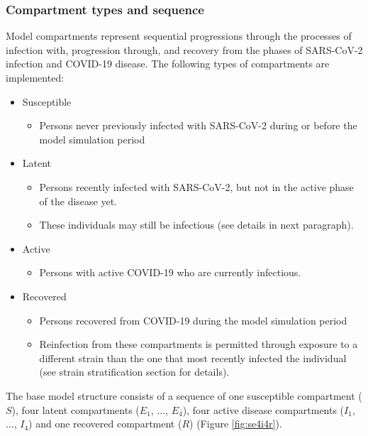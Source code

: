 \subsubsection{Compartment types and sequence}
Model compartments represent sequential progressions through the processes of 
infection with, progression through, and recovery from the phases of SARS-CoV-2
infection and COVID-19 disease. The following types of compartments are implemented:
\begin{itemize}
    \item Susceptible
    \begin{itemize}
        \item Persons never previously infected with SARS-CoV-2 during or before the model simulation period
    \end{itemize}
    \item Latent
    \begin{itemize}
        \item Persons recently infected with SARS-CoV-2, but not in the active phase of the disease yet.
        \item These individuals may still be infectious (see details in next paragraph).
    \end{itemize}
    \item Active
    \begin{itemize}
        \item Persons with active COVID-19 who are currently infectious.
    \end{itemize}
    \item Recovered
    \begin{itemize}
        \item Persons recovered from COVID-19 during the model simulation period       
        \item Reinfection from these compartments is permitted through exposure to a different
        strain than the one that most recently infected the individual (see strain stratification section for details).
    \end{itemize}
\end{itemize}
The base model structure consists of a sequence of one susceptible compartment ($S$), four latent compartments ($E_1$, ..., $E_4$), four active disease compartments ($I_1$, ..., $I_4$) and one recovered compartment ($R$) (Figure \ref{fig:se4i4r}).

